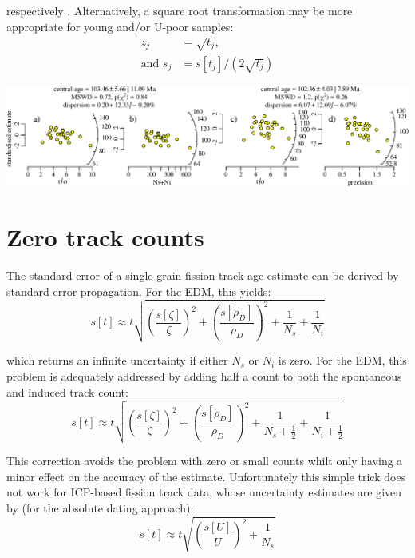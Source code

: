 \begin{refsection}
respectively \citep{galbraith2010b}. Alternatively, a square root
transformation may be more appropriate for young and/or U-poor
samples:
\begin{align}
  z_j & = \sqrt{{t}_j} \mbox{,}   \label{eq:zj3} \\
  \mbox{and~} s_j & = s[{t}_j]\bigg/\left(2\sqrt{{t}_j}\right)
  \label{eq:sj3}
\end{align}

\noindent\includegraphics[width=\linewidth]{../figures/FTradial.pdf}
\begingroup {}  \endgroup

\section{Zero track counts}
\label{sec:zeroICP}

The standard error of a single grain fission track age estimate can be
derived by standard error propagation.  For the EDM, this yields:
\begin{equation}
s[{t}] \approx {t} \sqrt{ 
  \left(\frac{s[{\zeta}]}{{\zeta}}\right)^2 +
  \left(\frac{s[{\rho_D}]}{{\rho_D}}\right)^2 +
  \frac{1}{N_s} + \frac{1}{N_i}
}
\label{eq:stEDM}
\end{equation}

\noindent which returns an infinite uncertainty if either $N_s$ or
$N_i$ is zero. For the EDM, this problem is adequately addressed by
adding half a count to both the spontaneous and induced track count:
\begin{equation}
s[{t}] \approx {t} \sqrt{ 
  \left(\frac{s[{\zeta}]}{{\zeta}}\right)^2 +
  \left(\frac{s[{\rho_D}]}{{\rho_D}}\right)^2 +
  \frac{1}{N_s+\frac{1}{2}} + \frac{1}{N_i+\frac{1}{2}}
}
\label{eq:stEDM0}
\end{equation}

This correction avoids the problem with zero or small counts whilt
only having a minor effect on the accuracy of the
estimate. Unfortunately this simple trick does not work for ICP-based
fission track data, whose uncertainty estimates are given by (for the
absolute dating approach):
\begin{equation}
s[{t}] \approx {t} \sqrt{ 
  \left(\frac{s[{U}]}{{U}}\right)^2 +
  \frac{1}{N_s}
}
\label{eq:shatt4}
\end{equation}


\end{refsection}
